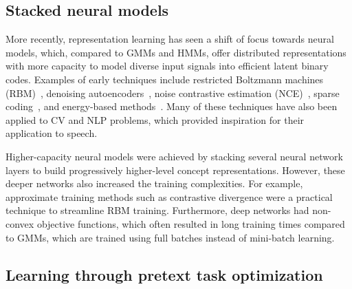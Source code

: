 \subsection{Stacked neural models}
\label{subsec:stack}

More recently, representation learning has seen a shift of focus towards neural models,
which, compared to GMMs and HMMs, offer distributed representations with more
capacity to model diverse input signals into efficient latent binary codes. 
Examples of early techniques include restricted Boltzmann machines
(RBM)~\cite{hinton_2006}, denoising autoencoders~\cite{DAE}, noise contrastive
estimation (NCE)~\cite{gutmann2012noise}, sparse coding~\cite{Olshausen1996,
sparse_lee, sivaram2010sparse}, and energy-based methods~\cite{Ranzato2007}.
Many of these techniques have also been applied to CV and NLP problems, which
provided inspiration for their application to speech.

Higher-capacity neural models were achieved by stacking several neural network
layers to build progressively higher-level concept representations.
However, these deeper networks also increased the training complexities. For
example, approximate training methods such as contrastive divergence
\cite{hinton_cd_2002} were a practical technique to 
  streamline RBM training.                   %
Furthermore, deep networks had non-convex objective functions, which
often resulted in long training times compared to GMMs, which are trained
using full batches instead of mini-batch learning.



\subsection{Learning through pretext task optimization}

